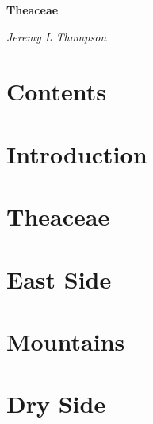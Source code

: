 \documentclass[oneside]{book}
\begin{document}
\begin{titlepage}
\centering

{\Huge\bfseries\color{firebrick} Theaceae\par}
\vspace{2cm}
{\large\itshape Jeremy L Thompson}

\end{titlepage}

\chapter*{Contents}

\begin{multicols}{2}
\makeatletter
\large{
}
\makeatother
\end{multicols}

\chapter*{Introduction}



\chapter{Theaceae}



\chapter{East Side}



\chapter{Mountains}



\chapter{Dry Side}


\end{document}

